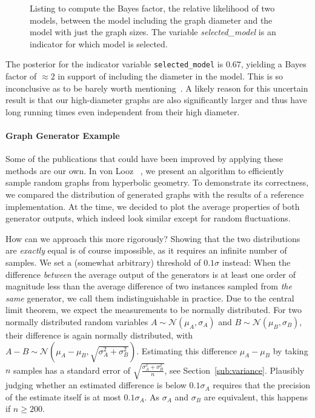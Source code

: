 \documentclass[algorithms,article,submit,moreauthors,pdftex]{Definitions/mdpi}
\newcommand{\changed}[1]{#1}
\newcommand{\removed}[1]{}
\begin{document}
\begin{figure}
\centering
\theverbbox
\caption{Listing to compute the Bayes factor, the relative likelihood of two models, between the model including the graph diameter and the model with just the graph sizes.
The variable \emph{selected\_model} is an indicator for which model is selected.
}
\label{listing:bayes-factor}
\end{figure}

The posterior for the indicator variable \texttt{selected\_model} is \changed{$0.67$}, yielding a Bayes factor of \changed{$\approx 2$} in support of including the diameter in the model.
\changed{This is so inconclusive as to be barely worth mentioning~\cite{jeffreys1998theory}.}
\changed{A likely reason for this uncertain result is that our high-diameter graphs are also significantly larger and thus have long running times even independent from their high diameter.}

\paragraph{Graph Generator Example}
\changed{Some of the publications that could have been improved by applying these methods are our own.
In von Looz \etal~\cite{von2015generating}, we present an algorithm to efficiently sample random graphs from hyperbolic geometry.
To demonstrate its correctness, we compared the distribution of generated graphs with the results of a reference implementation.
At the time, we decided to plot the average properties of both generator outputs, which indeed look similar except for random fluctuations.}

\changed{
How can we approach this more rigorously?
Showing that the two distributions are \emph{exactly} equal is of course impossible, as it requires an infinite number of samples.
We set a (somewhat arbitrary) threshold of $0.1\sigma$ instead:
When the difference \emph{between} the average output of the generators is at least one order of magnitude less than the average difference of two instances sampled from
\emph{the same} generator, we call them indistinguishable in practice.
Due to the central limit theorem, we expect the measurements to be normally distributed.
For two normally distributed random variables $A \sim \mathcal{N}(\mu_A, \sigma_A)$ and $B \sim \mathcal{N}(\mu_B, \sigma_B)$, their difference is again normally distributed, with $A - B \sim \mathcal{N}(\mu_A-\mu_B, \sqrt{\sigma_A^2 + \sigma_B^2})$.
Estimating this difference $\mu_A-\mu_B$ by taking $n$ samples has a standard error of $\sqrt{\frac{\sigma_A^2 + \sigma_B^2}{n}}$, see Section~\ref{sub:variance}.
Plausibly judging whether an estimated difference is below $0.1\sigma_A$ requires that the precision of the estimate itself is at most $0.1\sigma_A$. %
As $\sigma_A$ and $\sigma_B$ are equivalent, this happens if $n \geq 200$.}%
\end{document}
